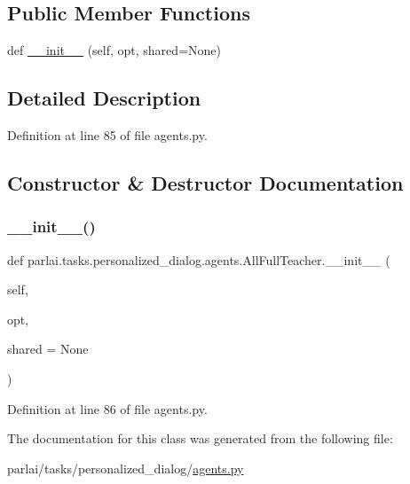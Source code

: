 \subsection*{Public Member Functions}
\begin{DoxyCompactItemize}
\item 
def \hyperlink{classparlai_1_1tasks_1_1personalized__dialog_1_1agents_1_1AllFullTeacher_a0ff199f278a48cb4c7979503ef501916}{\+\_\+\+\_\+init\+\_\+\+\_\+} (self, opt, shared=None)
\end{DoxyCompactItemize}


\subsection{Detailed Description}


Definition at line 85 of file agents.\+py.



\subsection{Constructor \& Destructor Documentation}
\mbox{\label{classparlai_1_1tasks_1_1personalized__dialog_1_1agents_1_1AllFullTeacher_a0ff199f278a48cb4c7979503ef501916}} 
\subsubsection{\texorpdfstring{\+\_\+\+\_\+init\+\_\+\+\_\+()}{\_\_init\_\_()}}
{\footnotesize\ttfamily def parlai.\+tasks.\+personalized\+\_\+dialog.\+agents.\+All\+Full\+Teacher.\+\_\+\+\_\+init\+\_\+\+\_\+ (\begin{DoxyParamCaption}\item[{}]{self,  }\item[{}]{opt,  }\item[{}]{shared = {\ttfamily None} }\end{DoxyParamCaption})}



Definition at line 86 of file agents.\+py.



The documentation for this class was generated from the following file\+:\begin{DoxyCompactItemize}
\item 
parlai/tasks/personalized\+\_\+dialog/\hyperlink{parlai_2tasks_2personalized__dialog_2agents_8py}{agents.\+py}\end{DoxyCompactItemize}
